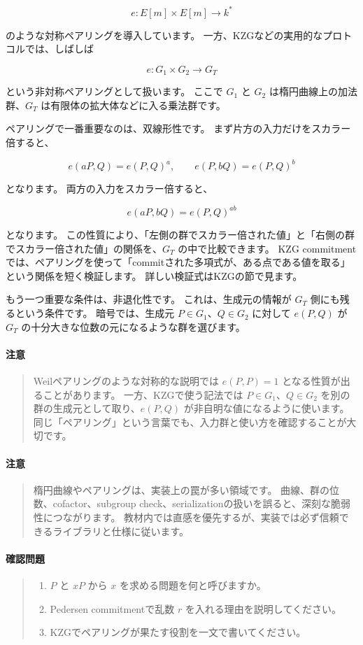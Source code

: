 \documentclass[a4paper,11pt]{ltjsarticle}
\newenvironment{warnbox}{%
  \paragraph*{注意}\begin{quote}
}{%
  \end{quote}
}
\newenvironment{checkpointbox}{%
  \paragraph*{確認問題}\begin{quote}
}{%
  \end{quote}
}
\begin{document}
\[
  e:E[m]\times E[m]\to k^\ast
\]

のような対称ペアリングを導入しています。
一方、KZGなどの実用的なプロトコルでは、しばしば

\[
  e:G_1\times G_2\to G_T
\]

という非対称ペアリングとして扱います。
ここで \(G_1\) と \(G_2\) は楕円曲線上の加法群、\(G_T\) は有限体の拡大体などに入る乗法群です。

ペアリングで一番重要なのは、双線形性です。
まず片方の入力だけをスカラー倍すると、

\[
  e(aP,Q)=e(P,Q)^a,\qquad
  e(P,bQ)=e(P,Q)^b
\]

となります。
両方の入力をスカラー倍すると、

\[
  e(aP,bQ)=e(P,Q)^{ab}
\]

となります。
この性質により、「左側の群でスカラー倍された値」と「右側の群でスカラー倍された値」の関係を、\(G_T\) の中で比較できます。
KZG commitmentでは、ペアリングを使って「commitされた多項式が、ある点である値を取る」という関係を短く検証します。
詳しい検証式はKZGの節で見ます。

もう一つ重要な条件は、非退化性です。
これは、生成元の情報が \(G_T\) 側にも残るという条件です。
暗号では、生成元 \(P\in G_1\)、\(Q\in G_2\) に対して \(e(P,Q)\) が \(G_T\) の十分大きな位数の元になるような群を選びます。

\begin{warnbox}
Weilペアリングのような対称的な説明では \(e(P,P)=1\) となる性質が出ることがあります。
一方、KZGで使う記法では \(P\in G_1\)、\(Q\in G_2\) を別の群の生成元として取り、\(e(P,Q)\) が非自明な値になるように使います。
同じ「ペアリング」という言葉でも、入力群と使い方を確認することが大切です。
\end{warnbox}

\begin{warnbox}
楕円曲線やペアリングは、実装上の罠が多い領域です。
曲線、群の位数、cofactor、subgroup check、serializationの扱いを誤ると、深刻な脆弱性につながります。
教材内では直感を優先するが、実装では必ず信頼できるライブラリと仕様に従います。
\end{warnbox}

\begin{checkpointbox}
\begin{enumerate}
  \item \(P\) と \(xP\) から \(x\) を求める問題を何と呼びますか。
  \item Pedersen commitmentで乱数 \(r\) を入れる理由を説明してください。
  \item KZGでペアリングが果たす役割を一文で書いてください。
\end{enumerate}
\end{checkpointbox}
\end{document}
